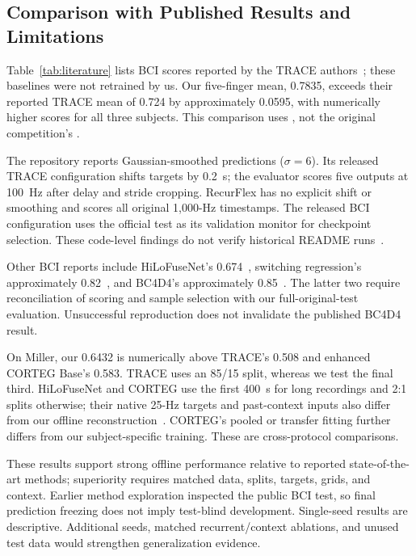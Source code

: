 

\subsection{Comparison with Published Results and Limitations}
Table~\ref{tab:literature} lists BCI scores reported by the TRACE authors~\cite{trace2026}; these baselines were not retrained by us. Our five-finger mean, 0.7835, exceeds their reported TRACE mean of 0.724 by approximately 0.0595, with numerically higher scores for all three subjects. This comparison uses \rFive{}, not the original competition's \rFour{}.

The repository reports Gaussian-smoothed predictions ($\sigma=6$). Its released TRACE configuration shifts targets by 0.2~s; the evaluator scores five outputs at 100~Hz after delay and stride cropping. RecurFlex has no explicit shift or smoothing and scores all original 1,000-Hz timestamps. The released BCI configuration uses the official test as its validation monitor for checkpoint selection. These code-level findings do not verify historical README runs~\cite{trace2026}.

Other BCI reports include HiLoFuseNet's 0.674~\cite{hilofusenet}, switching regression's approximately 0.82~\cite{switching2016}, and BC4D4's approximately 0.85~\cite{bc4d4}. The latter two require reconciliation of scoring and sample selection with our full-original-test evaluation. Unsuccessful reproduction does not invalidate the published BC4D4 result.

On Miller, our 0.6432 is numerically above TRACE's 0.508 and enhanced CORTEG Base's 0.583. TRACE uses an 85/15 split, whereas we test the final third. HiLoFuseNet and CORTEG use the first 400~s for long recordings and 2:1 splits otherwise; their native 25-Hz targets and past-context inputs also differ from our offline reconstruction~\cite{hilofusenet,corteg}. CORTEG's pooled or transfer fitting further differs from our subject-specific training. These are cross-protocol comparisons.



These results support strong offline performance relative to reported state-of-the-art methods; superiority requires matched data, splits, targets, grids, and context. Earlier method exploration inspected the public BCI test, so final prediction freezing does not imply test-blind development. Single-seed results are descriptive. Additional seeds, matched recurrent/context ablations, and unused test data would strengthen generalization evidence.

